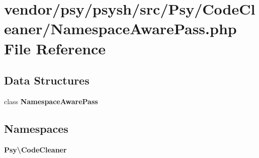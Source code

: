 \section{vendor/psy/psysh/src/\+Psy/\+Code\+Cleaner/\+Namespace\+Aware\+Pass.php File Reference}
\label{_namespace_aware_pass_8php}
\subsection*{Data Structures}
\begin{DoxyCompactItemize}
\item 
class {\bf Namespace\+Aware\+Pass}
\end{DoxyCompactItemize}
\subsection*{Namespaces}
\begin{DoxyCompactItemize}
\item 
 {\bf Psy\textbackslash{}\+Code\+Cleaner}
\end{DoxyCompactItemize}
